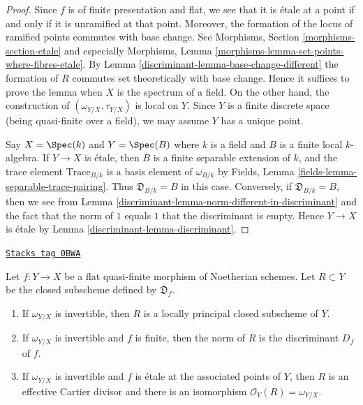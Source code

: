 \begin{proof}

Since $f$ is of finite presentation and flat, we see that it is \'etale
at a point if and only if it is unramified at that point. Moreover, the
formation of the locus of ramified points commutes with base change.
See Morphisms, Section \ref{morphisms-section-etale} and especially
Morphisms, Lemma \ref{morphisms-lemma-set-points-where-fibres-etale}.
By Lemma \ref{discriminant-lemma-base-change-different} the formation of $R$ commutes
set theoretically with base change. Hence it suffices to prove the
lemma when $X$ is the spectrum of a field. On the other hand, the
construction of $(\omega_{Y/X}, \tau_{Y/X})$ is local on $Y$.
Since $Y$ is a finite discrete space (being quasi-finite
over a field), we may assume $Y$ has a unique point.

\medskip\noindent
Say $X = \Spec(k)$ and $Y = \Spec(B)$ where $k$ is a field and $B$ is
a finite local $k$-algebra. If $Y \to X$ is \'etale, then
$B$ is a finite separable extension of $k$, and the trace
element $\text{Trace}_{B/k}$ is a basis element of $\omega_{B/k}$
by Fields, Lemma \ref{fields-lemma-separable-trace-pairing}.
Thus $\mathfrak{D}_{B/k} = B$ in this case.
Conversely, if $\mathfrak{D}_{B/k} = B$, then we see from
Lemma \ref{discriminant-lemma-norm-different-in-discriminant}
and the fact that the norm of $1$ equals $1$ that the
discriminant is empty. Hence
$Y \to X$ is \'etale by Lemma \ref{discriminant-lemma-discriminant}.
\end{proof}

\begin{lemma}
\label{discriminant-lemma-norm-different-is-discriminant}
\href{https://stacks.math.columbia.edu/tag/0BWA}{\texttt{Stacks tag 0BWA}}

Let $f : Y \to X$ be a flat quasi-finite morphism of Noetherian schemes.
Let $R \subset Y$ be the closed subscheme defined by $\mathfrak{D}_f$.
\begin{enumerate}
\item If $\omega_{Y/X}$ is invertible,
then $R$ is a locally principal closed subscheme of $Y$.
\item If $\omega_{Y/X}$ is invertible and $f$ is finite, then
the norm of $R$ is the discriminant $D_f$ of $f$.
\item If $\omega_{Y/X}$ is invertible and $f$
is \'etale at the associated points of $Y$, then $R$
is an effective Cartier divisor and there is an
isomorphism $\mathcal{O}_Y(R) = \omega_{Y/X}$.
\end{enumerate}
\end{lemma}

